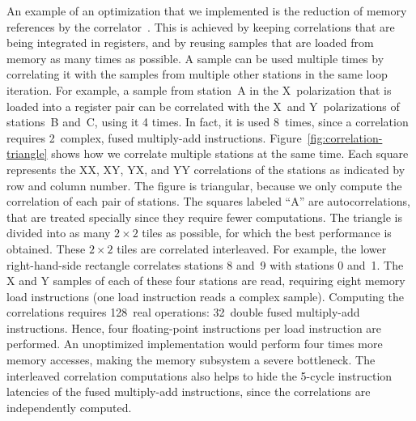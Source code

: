 \documentclass{sig-alternate}
\begin{document}
An example of an optimization that we implemented is the reduction of
memory references by the correlator~\cite{Romein:06}.
This is achieved by keeping correlations that are being integrated
in registers, and by reusing samples that are loaded from memory as many times
as possible.
A sample can be used multiple times by correlating it with the samples from
multiple other stations in the same loop iteration.
For example, a sample from station~A in the X~polarization that is loaded into
a register pair can be correlated with the X~and Y~polarizations of
stations~B and~C, using it 4 times.
In fact, it is used 8~times, since a correlation requires 2~complex, fused
multiply-add instructions.
Figure~\ref{fig:correlation-triangle} shows how we correlate multiple
stations at the same time.
Each square represents the XX, XY, YX, and YY correlations of the stations
as indicated by row and column number.
The figure is triangular, because we only compute the correlation of each
pair of stations.
The squares labeled ``\textsf{A}'' are autocorrelations, that are treated
specially since they require fewer computations.
The triangle is divided into as many $2\times2$ tiles as possible, for which
the best performance is obtained.
These $2\times2$ tiles are correlated interleaved.
For example, the lower right-hand-side rectangle correlates stations 8 and~9
with stations 0 and~1.
The X and Y samples of each of these four stations are read, requiring eight
memory load instructions (one load instruction reads a complex sample).
Computing the correlations requires 128~real operations: 32~double fused
multiply-add instructions.
Hence, four floating-point instructions per load instruction are performed.
An unoptimized implementation would perform four times more memory accesses,
making the memory subsystem a severe bottleneck.
The interleaved correlation computations also helps to hide the 5-cycle
instruction latencies of the fused multiply-add instructions, since
the correlations are independently computed.


\end{document}
